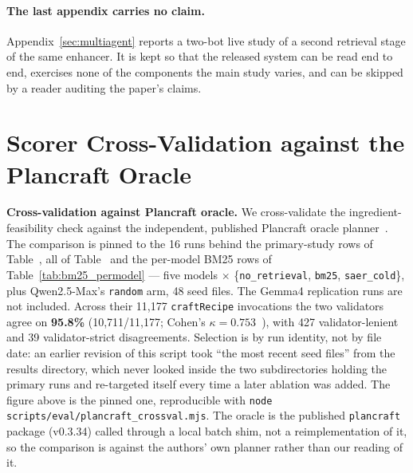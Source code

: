 \documentclass[letterpaper]{article} %
\newcommand{\appref}[1]{Appendix~\ref{#1}}
\newcommand{\bodyref}[1]{\getrefnumber{#1}}
\begin{document}
\paragraph{The last appendix carries no claim.}  \appref{sec:multiagent}
reports a two-bot live study of a second retrieval stage of the same enhancer.
It is kept so that the released system can be read end to end, exercises none
of the components the main study varies, and can be skipped by a reader
auditing the paper's claims.

\section{Scorer Cross-Validation against the Plancraft Oracle}
\label{app:plancraft}
\noindent\textbf{Cross-validation against Plancraft oracle.}
We cross-validate the ingredient-feasibility check against the
independent, published Plancraft oracle planner~\citep{dagan2024plancraft}.
The comparison is pinned to the 16 runs behind the primary-study rows of
Table~\bodyref{tab:main}, all of Table~\bodyref{tab:ablation} and the per-model BM25
rows of Table~\ref{tab:bm25_permodel} --- five models
$\times$ \{\texttt{no\_retrieval}, \texttt{bm25}, \texttt{saer\_cold}\}, plus
Qwen2.5-Max's \texttt{random} arm, 48 seed files.  The Gemma4 replication
runs are not included.  Across their 11,177
\texttt{craftRecipe} invocations the two validators agree on
\textbf{95.8\%} (10,711/11,177; Cohen's
$\kappa{=}0.753$~\citep{landis1977measurement}), with 427
validator-lenient and 39 validator-strict disagreements.  Selection is by
run identity, not by file date: an earlier revision of this script took
``the most recent seed files'' from the results directory, which never
looked inside the two subdirectories holding the primary runs and
re-targeted itself every time a later ablation was added.  The figure above
is the pinned one, reproducible with
\texttt{node scripts/eval/plancraft\_crossval.mjs}.  The oracle is the
published \texttt{plancraft} package (v0.3.34) called through a local batch
shim, not a reimplementation of it, so the comparison is against the authors'
own planner rather than our reading of it.
\end{document}
